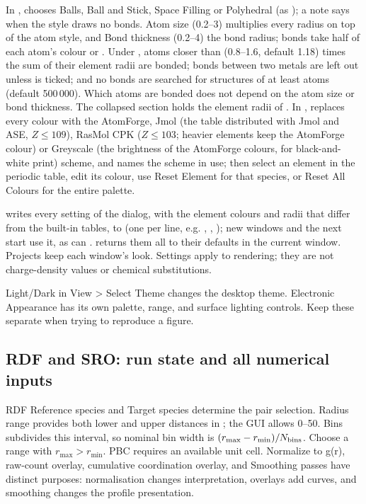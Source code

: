 In ,  chooses Balls, Ball and Stick, Space Filling or Polyhedral (as ); a note says when the style draws no bonds. Atom size (0.2--3\texttimes) multiplies every radius on top of the atom style, and Bond thickness (0.2--4\texttimes) the bond radius; bonds take half of each atom's colour or . Under , atoms closer than  (0.8--1.6, default 1.18) times the sum of their element radii are bonded; bonds between two metals are left out unless  is ticked; and no bonds are searched for structures of at least  atoms (default 500\,000). Which atoms are bonded does not depend on the atom size or bond thickness. The collapsed  section holds the element radii of . In ,  replaces every colour with the AtomForge, Jmol (the table distributed with Jmol and ASE, $Z \le 109$), RasMol CPK ($Z \le 103$; heavier elements keep the AtomForge colour) or Greyscale (the brightness of the AtomForge colours, for black-and-white print) scheme, and names the scheme in use; then select an element in the periodic table, edit its colour, use Reset Element for that species, or Reset All Colours for the entire palette.

 writes every setting of the dialog, with the element colours and radii that differ from the built-in tables, to  (one  per line, e.g. , , ); new windows and the next start use it, as can .  returns them all to their defaults in the current window. Projects keep each window's look. Settings apply to rendering; they are not charge-density values or chemical substitutions.

Light/Dark in View > Select Theme changes the desktop theme. Electronic Appearance has its own palette, range, and surface lighting controls. Keep these separate when trying to reproduce a figure.

\subsection{RDF and SRO: run state and all numerical inputs}
RDF Reference species and Target species determine the pair selection. Radius range provides both lower and upper distances in \angstrom; the GUI allows 0--50. Bins subdivides this interval, so nominal bin width is $(r_{\max}-r_{\min})/N_{\rm bins}$. Choose a range with $r_{\max}>r_{\min}$. PBC requires an available unit cell. Normalize to g(r), raw-count overlay, cumulative coordination overlay, and Smoothing passes have distinct purposes: normalisation changes interpretation, overlays add curves, and smoothing changes the profile presentation.

